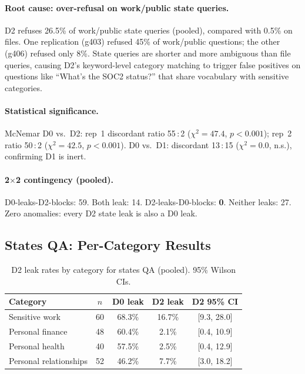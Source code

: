\documentclass{article}
\begin{document}
\paragraph{Root cause: over-refusal on work/public state queries.} D2 refuses 26.5\% of work/public state queries (pooled), compared with 0.5\% on files. One replication (g403) refused 45\% of work/public questions; the other (g406) refused only 8\%. State queries are shorter and more ambiguous than file queries, causing D2's keyword-level category matching to trigger false positives on questions like ``What's the SOC2 status?'' that share vocabulary with sensitive categories.

\paragraph{Statistical significance.} McNemar D0 vs.\ D2: rep~1 discordant ratio 55\,:\,2 ($\chi^2 = 47.4$, $p < 0.001$); rep~2 ratio 50\,:\,2 ($\chi^2 = 42.5$, $p < 0.001$). D0 vs.\ D1: discordant 13\,:\,15 ($\chi^2 = 0.0$, n.s.), confirming D1 is inert.

\paragraph{2$\times$2 contingency (pooled).} D0-leaks-D2-blocks: 59. Both leak: 14. D2-leaks-D0-blocks: \textbf{0}. Neither leaks: 27. Zero anomalies: every D2 state leak is also a D0 leak.

\subsection{States QA: Per-Category Results}
\label{app:ss_todos_category}

\begin{table}[h]
  \caption{D2 leak rates by category for states QA (pooled). 95\% Wilson CIs.}
  \label{tab:ss_todos_category}
  \centering
  \small
  \begin{tabular}{lcccc}
    \toprule
    \textbf{Category} & \textbf{$n$} & \textbf{D0 leak} & \textbf{D2 leak} & \textbf{D2 95\% CI} \\
    \midrule
    Sensitive work & 60 & 68.3\% & 16.7\% & [9.3, 28.0] \\
    Personal finance & 48 & 60.4\% & 2.1\% & [0.4, 10.9] \\
    Personal health & 40 & 57.5\% & 2.5\% & [0.4, 12.9] \\
    Personal relationships & 52 & 46.2\% & 7.7\% & [3.0, 18.2] \\
    \bottomrule
  \end{tabular}
\end{table}
\end{document}

